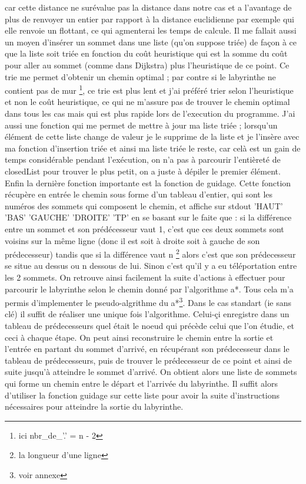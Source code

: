 \documentclass[a4paper, 11pt]{report}
\begin{document}
car cette distance ne surévalue pas la distance dans notre cas et a l'avantage de plus de renvoyer un entier par rapport à la distance euclidienne par exemple qui elle renvoie un flottant, ce qui agmenterai les temps de calcule.
Il me fallait aussi un moyen d'insérer un sommet dans une liste (qu'on suppose triée) de façon à ce que la liste soit triée en fonction du coût heuristique qui est la somme du coût pour aller au sommet (comme dans Dijkstra) plus l'heuristique de ce point. Ce trie me permet d'obtenir un chemin optimal ; par contre si le labyrinthe ne contient pas de mur \footnote{ici nbr\_de\_'.' = n - 2}, ce trie est plus lent et j'ai préféré trier selon l'heuristique et non le coût heuristique, ce qui ne m'assure pas de trouver le chemin optimal dans tous les cas  mais qui est plus rapide lors de l'execution du programme.
J'ai aussi une fonction qui me permet de mettre à jour ma liste triée ; lorsqu'un élément de cette liste change de valeur je le supprime de la liste et je l'insère avec ma fonction d'insertion triée et ainsi ma liste triée le reste, car celà est un gain de temps considérable pendant l'exécution, on n'a pas à parcourir l'entièreté de closedList pour trouver le plus petit, on a juste à dépiler le premier élément.
Enfin la dernière fonction importante est la fonction de guidage. Cette fonction récupère en entrée le chemin sous forme d'un tableau d'entier, qui sont les numéros des sommets qui composent le chemin, et affiche sur stdout 'HAUT' 'BAS' 'GAUCHE' 'DROITE' 'TP' en se basant sur le faite que : si la différence entre un sommet et son prédécesseur vaut 1, c'est que ces deux sommets sont voisins sur la même ligne (donc il est soit à droite soit à gauche de son prédecesseur) tandis que si la différence vaut n \footnote{la longueur d'une ligne} alors c'est que son prédecesseur se situe au dessus ou n dessous de lui. Sinon c'est qu'il y a eu téléportation entre les 2 sommets. On retrouve ainsi facilement la suite d'actions à effectuer pour parcourir le labyrinthe selon le chemin donné par l'algorithme a*.
Tous cela m'a permis d'implementer le pseudo-algrithme du a*\footnote{voir annexe}.
Dans le cas standart (ie sans clé) il suffit de réaliser une unique fois l'algorithme. Celui-çi enregistre dans un tableau de prédecesseurs quel était le noeud qui précède celui que l'on étudie, et ceci à chaque étape. On peut ainsi reconstruire le chemin entre la sortie et l'entrée en partant du sommet d'arrivé, en récupérant son prédecesseur dans le tableau de prédecesseurs, puis de trouver le prédecesseur de ce point et ainsi de suite jusqu'à atteindre le sommet d'arrivé. On obtient alors une liste de sommets qui forme un chemin entre le départ et l'arrivée du labyrinthe. Il suffit alors d'utiliser la fonction guidage sur cette liste pour avoir la suite d'instructions nécessaires pour atteindre la sortie du labyrinthe.\\
\end{document}
